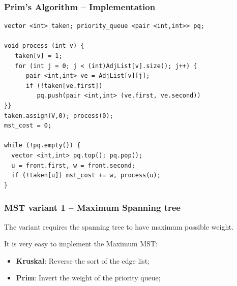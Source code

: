 \begin{frame}[fragile]
  \frametitle{Prim's Algorithm -- Implementation}
{\smaller
\begin{exampleblock}{}
\begin{verbatim}
vector <int> taken; priority_queue <pair <int,int>> pq;

void process (int v) {
   taken[v] = 1;
   for (int j = 0; j < (int)AdjList[v].size(); j++) {
      pair <int,int> ve = AdjList[v][j];
      if (!taken[ve.first])
         pq.push(pair <int,int> (ve.first, ve.second))
}}
taken.assign(V,0); process(0);
mst_cost = 0;

while (!pq.empty()) {
  vector <int,int> pq.top(); pq.pop();
  u = front.first, w = front.second;
  if (!taken[u]) mst_cost += w, process(u);
}
\end{verbatim}
\end{exampleblock}
}
\end{frame}

\begin{frame}
  \frametitle{MST variant 1 -- Maximum Spanning tree}

    \begin{block}{}
      The  variant requires the spanning tree to have maximum possible weight.\bigskip


      It is very easy to implement the Maximum MST:
      \begin{itemize}
        \item {\bf Kruskal}: Reverse the sort of the edge list;
        \item {\bf Prim}: Invert the weight of the priority queue;
      \end{itemize}
    \end{block}

  \medskip

\end{frame}

